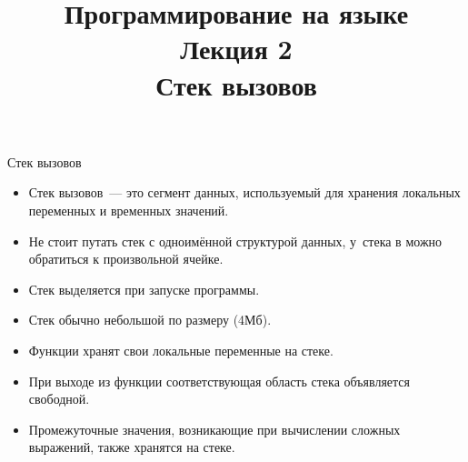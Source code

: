 \documentclass{beamer}
\title{{\bf Программирование на языке \langcpp\protect\\Лекция
2\protect\vspace{1em}\\}Стек вызовов}
\begin{document}
\begin{frame} 
  \titlepage
\end{frame}


\begin{frame}[fragile]{Стек вызовов}
    \begin{itemize}
        \item Стек вызовов~— это сегмент данных, используемый для хранения локальных
            переменных и временных значений.

        \item Не стоит путать стек с одноимённой структурой данных, у~стека в \langcpp
            можно обратиться к произвольной ячейке.

        \item Стек выделяется при запуске программы.

        \item Стек обычно небольшой по размеру (4Мб).

        \item Функции хранят свои локальные переменные на стеке. 
        
        \item При выходе из функции соответствующая область стека
            объявляется свободной.

        \item Промежуточные значения, возникающие при вычислении
            сложных выражений, также хранятся на стеке.
    \end{itemize}
\end{frame}
\end{document}

